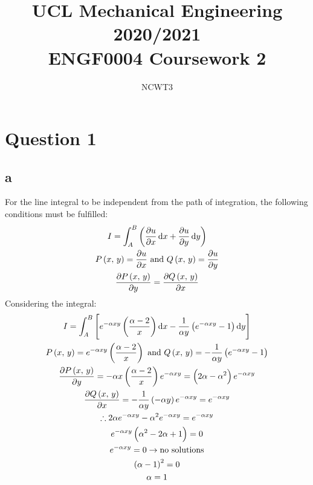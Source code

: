 \documentclass[11pt]{article}
\numberwithin{equation}{section}
\begin{document}
\title{\textbf{UCL Mechanical Engineering 2020/2021}\\ENGF0004 Coursework 2}
\author{NCWT3}
\maketitle
\section{Question 1}
\subsection{a}
For the line integral to be independent from the path of integration, the following conditions must be fulfilled:
\begin{gather}
    I = \int_A^B \left(\frac{\partial u}{\partial x} \dif x + \frac{\partial u}{\partial y}\dif y\right)\\
    P\left(x, \, y\right) = \frac{\partial u}{\partial x} \textrm{ and } Q\left(x, \, y\right) = \frac{\partial u}{\partial y}\\
    \frac{\partial P\left(x, \, y\right)}{\partial y} = \frac{\partial Q\left(x, \, y\right)}{\partial x}
\end{gather}
Considering the integral:
\begin{gather}
    I = \int_A^B \left[e^{-\alpha xy} \left(\frac{\alpha-2}{x}\right)\dif x - \frac{1}{\alpha y}\left(e^{-\alpha x y}-1\right)\dif y\right]\\
    P\left(x, \, y\right) = e^{-\alpha xy} \left(\frac{\alpha-2}{x}\right) \textrm{ and } Q\left(x, \, y\right) = - \frac{1}{\alpha y}\left(e^{-\alpha x y}-1\right)\\
    \frac{\partial P\left(x, \, y\right)}{\partial y} = -\alpha x \left(\frac{\alpha -2}{x}\right) e^{-\alpha xy} = \left(2\alpha - \alpha^2\right)e^{-\alpha xy}\\
    \frac{\partial Q\left(x, \, y\right)}{\partial x} = -\frac{1}{\alpha y}\left(-\alpha y\right)e^{-\alpha xy} = e^{-\alpha xy}\\
    \therefore 2\alpha e^{-\alpha xy} - \alpha^2 e^{-\alpha xy} = e^{-\alpha xy}\\
    e^{-\alpha xy} \left(\alpha^2 - 2\alpha + 1\right) = 0\\
    e^{-\alpha xy} = 0 \rightarrow \textrm{no solutions}\\
    \left(\alpha - 1\right)^2 = 0\\
    \alpha = 1
\end{gather}
\end{document}
